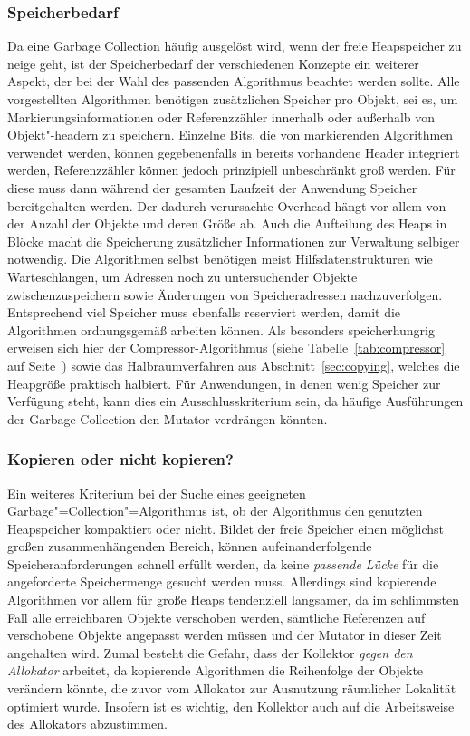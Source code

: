 

\subsubsection*{Speicherbedarf}
Da eine Garbage Collection häufig ausgelöst wird, wenn der freie Heapspeicher zu neige geht, ist der Speicherbedarf der verschiedenen Konzepte ein weiterer Aspekt, der bei der Wahl des passenden Algorithmus beachtet werden sollte.
Alle vorgestellten Algorithmen benötigen zusätzlichen Speicher pro Objekt, sei es, um Markierungsinformationen oder Referenzzähler innerhalb oder außerhalb von Objekt"-headern zu speichern.
Einzelne Bits, die von markierenden Algorithmen verwendet werden, können gegebenenfalls in bereits vorhandene Header integriert werden, Referenzzähler können jedoch prinzipiell unbeschränkt groß werden.
Für diese muss dann während der gesamten Laufzeit der Anwendung Speicher bereitgehalten werden.
Der dadurch verursachte Overhead hängt vor allem von der Anzahl der Objekte und deren Größe ab.
Auch die Aufteilung des Heaps in Blöcke macht die Speicherung zusätzlicher Informationen zur Verwaltung selbiger notwendig.
Die Algorithmen selbst benötigen meist Hilfsdatenstrukturen wie Warteschlangen, um Adressen noch zu untersuchender Objekte zwischenzuspeichern sowie Änderungen von Speicheradressen nachzuverfolgen.
Entsprechend viel Speicher muss ebenfalls reserviert werden, damit die Algorithmen ordnungsgemäß arbeiten können.
Als besonders speicherhungrig erweisen sich hier der Compressor-Algorithmus (siehe Tabelle~\ref{tab:compressor} auf Seite~\pageref{tab:compressor}) sowie das Halbraumverfahren aus Abschnitt~\ref{sec:copying}, welches die Heapgröße praktisch halbiert.
Für Anwendungen, in denen wenig Speicher zur Verfügung steht, kann dies ein Ausschlusskriterium sein, da häufige Ausführungen der Garbage Collection den Mutator verdrängen könnten.




\subsubsection*{Kopieren oder nicht kopieren?}
Ein weiteres Kriterium bei der Suche eines geeigneten Garbage"=Collection"=Algorithmus ist, ob der Algorithmus den genutzten Heapspeicher kompaktiert oder nicht.
Bildet der freie Speicher einen möglichst großen zusammenhängenden Bereich, können aufeinanderfolgende Speicheranforderungen schnell erfüllt werden, da keine \textit{passende Lücke} für die angeforderte Speichermenge gesucht werden muss.
Allerdings sind kopierende Algorithmen vor allem für große Heaps tendenziell langsamer, da im schlimmsten Fall alle erreichbaren Objekte verschoben werden, sämtliche Referenzen auf verschobene Objekte angepasst werden müssen und der Mutator in dieser Zeit angehalten wird.
Zumal besteht die Gefahr, dass der Kollektor \textit{gegen den Allokator} arbeitet, da kopierende Algorithmen die Reihenfolge der Objekte verändern könnte, die zuvor vom Allokator zur Ausnutzung räumlicher Lokalität optimiert wurde.
Insofern ist es wichtig, den Kollektor auch auf die Arbeitsweise des Allokators abzustimmen.


